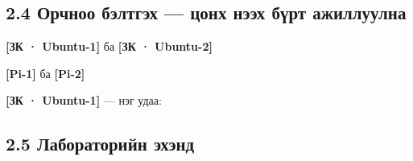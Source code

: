 \hypertarget{ux43eux440ux447ux43dux43eux43e-ux431ux44dux43bux442ux433ux44dux445-ux446ux43eux43dux445-ux43dux44dux44dux445-ux431ux4afux440ux442-ux430ux436ux438ux43bux43bux443ux443ux43bux43dux430}{%
\subsection{\texorpdfstring{2.4 Орчноо бэлтгэх --- \textbf{цонх нээх бүрт} ажиллуулна}{2.4 Орчноо бэлтгэх --- цонх нээх бүрт ажиллуулна}}\label{ux43eux440ux447ux43dux43eux43e-ux431ux44dux43bux442ux433ux44dux445-ux446ux43eux43dux445-ux43dux44dux44dux445-ux431ux4afux440ux442-ux430ux436ux438ux43bux43bux443ux443ux43bux43dux430}}

\textbf{{[}ЗК · Ubuntu-1{]}} ба \textbf{{[}ЗК · Ubuntu-2{]}}

\begin{Shaded}
\begin{Highlighting}[]
\KeywordTok{\&\&} 
 \OperatorTok{\textless{}}\OperatorTok{\textgreater{}}
\end{Highlighting}
\end{Shaded}

\textbf{{[}Pi-1{]}} ба \textbf{{[}Pi-2{]}}

\begin{Shaded}
\begin{Highlighting}[]
  \KeywordTok{\&\&} \KeywordTok{\&\&}  
\end{Highlighting}
\end{Shaded}

\textbf{{[}ЗК · Ubuntu-1{]}} --- нэг удаа:

\begin{Shaded}
\begin{Highlighting}[]
\KeywordTok{\&\&} 
\end{Highlighting}
\end{Shaded}

\hypertarget{ux43bux430ux431ux43eux440ux430ux442ux43eux440ux438ux439ux43d-ux44dux445ux44dux43dux434}{%
\subsection{2.5 Лабораторийн эхэнд}\label{ux43bux430ux431ux43eux440ux430ux442ux43eux440ux438ux439ux43d-ux44dux445ux44dux43dux434}}

